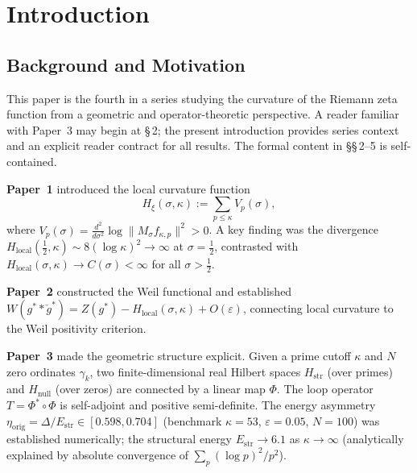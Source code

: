 \documentclass[11pt]{article}
\newcommand{\Hstr}{H_{\mathrm{str}}}
\newcommand{\Hnull}{H_{\mathrm{null}}}
\newcommand{\Estr}{E_{\mathrm{str}}}
\newcommand{\etaorig}{\eta_{\mathrm{orig}}}
\newcommand{\Tt}{\widetilde{T}}
\newcommand{\Ceta}{C_{\eta}}
\begin{document}
\begin{abstract}
\textbf{What remains open.}
The analytic proof of $\etaorig > 0$ without the above assumption
(Open Problem~6.2); whether a circularity-free spectral function
$f(\Tt)$ exists with spectrum converging to $\{\gamma_k\}$
(Open Problem~6.3); and the arithmetic origin of
$\Ceta \approx 0.39$ (Open Problem~6.4).

\textbf{Structure.}
The formal core is self-contained in \S\S\,2--5.
Sections~6 and~7 contain open problems and a geometric interpretation
(clearly marked, not used in proofs).
No use of the Riemann Hypothesis, the GUE conjecture, the Montgomery
pair correlation conjecture, or the Hilbert--P\'olya postulate is made
anywhere in \S\S\,2--5.
\end{abstract}

\section{Introduction}

\subsection{Background and Motivation}

This paper is the fourth in a series studying the curvature of the Riemann
zeta function from a geometric and operator-theoretic perspective.
A reader familiar with Paper~3 \cite{Paper3} may begin at \S\,2;
the present introduction provides series context and an explicit
reader contract for all results.
The formal content in \S\S\,2--5 is self-contained.

\textbf{Paper~1} \cite{Paper1} introduced the local curvature function
\[
H_\xi(\sigma,\kappa) := \sum_{p\leq\kappa} V_p(\sigma),
\]
where $V_p(\sigma) = \tfrac{d^2}{d\sigma^2}\log\|M_\sigma f_{\kappa,p}\|^2 > 0$.
A key finding was the divergence
$H_{\mathrm{local}}(\tfrac{1}{2},\kappa)\sim 8(\log\kappa)^2\to\infty$
at $\sigma=\tfrac{1}{2}$, contrasted with
$H_{\mathrm{local}}(\sigma,\kappa)\to C(\sigma)<\infty$
for all $\sigma>\tfrac{1}{2}$.

\textbf{Paper~2} \cite{Paper2} constructed the Weil functional and established
$W(g^*\ast\check{g}^*) = Z(g^*) - H_{\mathrm{local}}(\sigma,\kappa) + O(\varepsilon)$,
connecting local curvature to the Weil positivity criterion.

\textbf{Paper~3} \cite{Paper3} made the geometric structure explicit.
Given a prime cutoff $\kappa$ and $N$ zero ordinates $\gamma_k$,
two finite-dimensional real Hilbert spaces $\Hstr$ (over primes) and
$\Hnull$ (over zeros) are connected by a linear map $\Phi$.
The loop operator $T = \Phi^*\circ\Phi$ is self-adjoint and positive
semi-definite.
The energy asymmetry
$\etaorig = \Delta/\Estr \in [0.598, 0.704]$
(benchmark $\kappa=53$, $\varepsilon=0.05$, $N=100$) was established
numerically; the structural energy $\Estr\to 6.1$ as $\kappa\to\infty$
(analytically explained by absolute convergence of $\sum_p(\log p)^2/p^2$).
\end{document}
